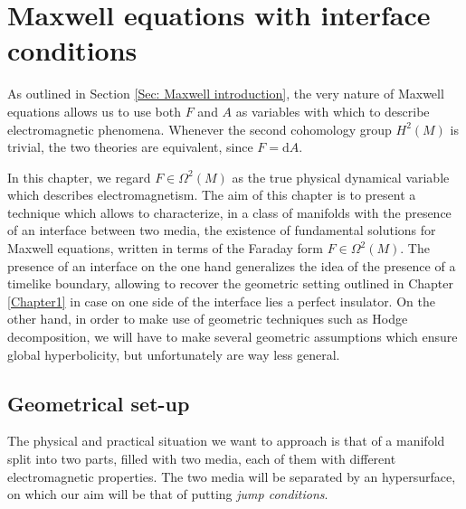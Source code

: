 \chapter{Maxwell equations with interface conditions} %





As outlined in Section \ref{Sec: Maxwell introduction}, the very nature of Maxwell equations allows us to use both $F$ and $A$ as variables with which to describe electromagnetic phenomena. Whenever the second cohomology group $H^2(M)$ is trivial, the two theories are equivalent, since $F=\mathrm{d}A$.


In this chapter, we regard $F\in\Omega^2(M)$ as the true physical dynamical variable which describes electromagnetism. The aim of this chapter is to present a technique which allows to characterize, in a class of manifolds with the presence of an interface between two media, the existence of fundamental solutions for Maxwell equations, written in terms of the Faraday form $F\in\Omega^2(M)$. The presence of an interface on the one hand generalizes the idea of the presence of a timelike boundary, allowing to recover the geometric setting outlined in Chapter \ref{Chapter1} in case on one side of the interface lies a perfect insulator. On the other hand, in order to make use of geometric techniques such as Hodge decomposition, we will have to make several geometric assumptions which ensure global hyperbolicity, but unfortunately are way less general.

\section{Geometrical set-up}
The physical and practical situation we want to approach is that of a manifold split into two parts, filled with two media, each of them with different electromagnetic properties. The two media will be separated by an hypersurface, on which our aim will be that of putting \emph{jump conditions}.

